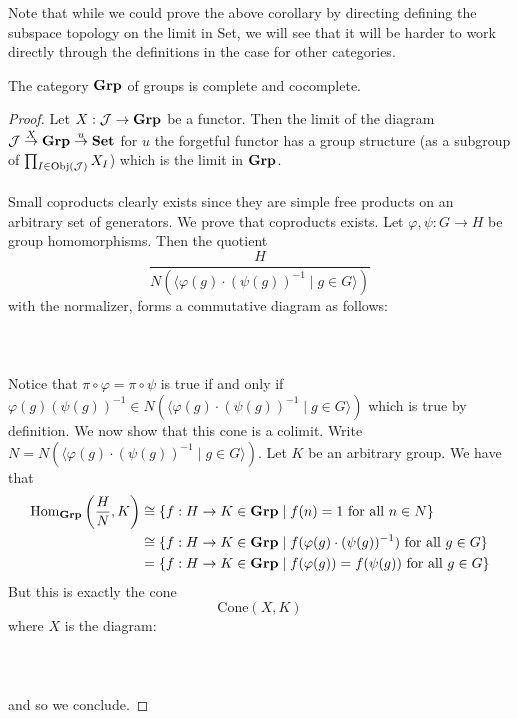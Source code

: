 \documentclass[a4paper]{article}
\begin{document}
Note that while we could prove the above corollary by directing defining the subspace topology on the limit in Set, we will see that it will be harder to work directly through the definitions in the case for other categories. 

\begin{crl}{}{} The category $\bold{Grp}$ of groups is complete and cocomplete. \tcbline
\begin{proof}
Let $X:\mathcal{J}\to\bold{Grp}$ be a functor. Then the limit of the diagram $\mathcal{J}\overset{X}{\to}\bold{Grp}\overset{u}{\to}\bold{Set}$ for $u$ the forgetful functor has a group structure (as a subgroup of $\prod_{I\in\text{Obj}(\mathcal{J})}X_I$) which is the limit in $\bold{Grp}$. \\~\\

Small coproducts clearly exists since they are simple free products on an arbitrary set of generators. We prove that coproducts exists. Let $\varphi,\psi:G\to H$ be group homomorphisms. Then the quotient $$\frac{H}{N(\langle\varphi(g)\cdot(\psi(g))^{-1}\;|\;g\in G\rangle)}$$ with the normalizer, forms a commutative diagram as follows: \\~\\
 \\~\\
Notice that $\pi\circ\varphi=\pi\circ\psi$ is true if and only if $\varphi(g)(\psi(g))^{-1}\in N(\langle\varphi(g)\cdot(\psi(g))^{-1}\;|\;g\in G\rangle)$ which is true by definition. We now show that this cone is a colimit. Write $N=N(\langle\varphi(g)\cdot(\psi(g))^{-1}\;|\;g\in G\rangle)$. Let $K$ be an arbitrary group. We have that 
\begin{align*}
\operatorname{Hom}_{\bold{Grp}}\left(\frac{H}{N},K\right)&\cong\{f:H\to K\in\bold{Grp}\;|\;f(n)=1\text{ for all }n\in N\}\\
&\cong\{f:H\to K\in\bold{Grp}\;|\;f(\varphi(g)\cdot(\psi(g))^{-1})\text{ for all }g\in G\}\\
&=\{f:H\to K\in\bold{Grp}\;|\;f(\varphi(g))=f(\psi(g))\text{ for all }g\in G\}
\end{align*}
But this is exactly the cone $$\text{Cone}\left(X,K\right)$$ where $X$ is the diagram: \\~\\
 \\~\\
and so we conclude. 
\end{proof}
\end{crl}
\end{document}
